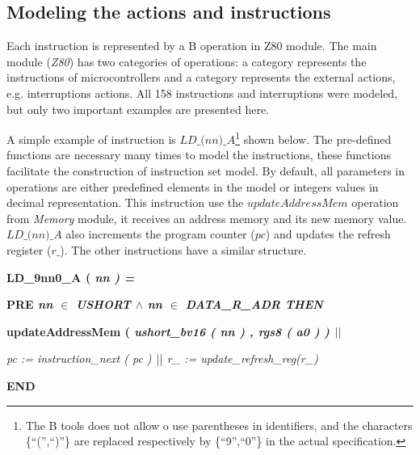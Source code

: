 \documentclass[a4paper]{llncs}
\begin{document}
\subsection{Modeling the actions and instructions}
Each instruction is represented by a B operation in Z80 module. The main
module (\textit{Z80}) has two categories of operations: a category represents the 
instructions of microcontrollers and a category represents the external actions, e.g.
interruptions actions. All 158 instructions and interruptions were modeled, but only
two important examples are presented here.

A simple example of instruction is $\textit{LD\_(nn)\_A}$\footnote{The B tools does not allow o use parentheses in identifiers, and the characters \{``('',``)''\} are
replaced respectively by \{``9'',``0''\} in the actual specification.} shown below. The
pre-defined functions are necessary many times to model the instructions, these
functions facilitate the construction of instruction set model. By default, all
parameters in operations are either predefined elements in the model or
integers values in decimal representation. This instruction use the
$\textit{updateAddressMem}$ operation from \textit{Memory} module, it receives
an address memory and its new memory value. $\textit{LD\_(nn)\_A}$ also increments the program
counter ($\textit{pc}$) and updates the refresh register ($\textit{r\_}$). The other instructions have a similar structure.

\hspace*{0.00in}\bf LD\_9nn0\_A \rm ( \it nn \rm ) \rm =

\hspace*{0.20in}\bf PRE \it nn $\in$ \it USHORT\hspace*{0.15in} $\land$ \hspace*{0.10in}\it nn\hspace*{0.10in} $\in$  \it DATA\_R\_ADR \hspace*{0.10in}\bf THEN

\hspace*{0.20in}\bf updateAddressMem \rm ( \it ushort\_bv16 \rm ( \it nn \rm ) \rm , \it rgs8 \rm ( \it a0 \rm )
\rm )  $\mbox{$\mid\mid$}$

\hspace*{0.20in}\it pc \rm := \it instruction\_next \rm ( \it pc \rm )  $\mbox{$\mid\mid$}$  \it r\_ \rm := \it update\_refresh\_reg\rm (\it r\_\rm )

\hspace*{0.00in}\bf END\rm 
\end{document}
